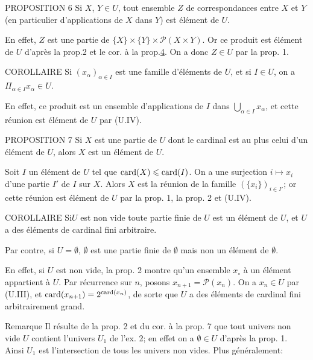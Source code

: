 \documentclass[10pt]{../fichiers-configuration-latex/smfart}
\begin{document}
\begin{enonce*}{PROPOSITION 6}
Si $X$, $Y\in U$, tout ensemble $Z$ de correspondances entre $X$ et
$Y$ (en particulier d'applications de $X$ dans $Y$) est élément de
$U$.
\end{enonce*}
En effet, $Z$ est une partie de $\{X\}\times \{Y\}\times
\mathcal{P}(X\times Y)$. Or ce produit est élément de $U$
d'après la
prop.2 et le cor. à la prop.\hyperref[I.sec4]{4}. On a donc $Z\in
U$ par la prop. 1.

\begin{enonce*}{COROLLAIRE}
Si $(x_{\alpha})_{\alpha \in I}$ est une famille d'éléments de $U$,
et si $I\in U$, on a $\Pi_{\alpha\in I}x_{\alpha} \in U$.
\end{enonce*}
En effet, ce produit est un ensemble d'applications de $I$ dans
$\bigcup_{\alpha\in I}x_{\alpha}$, et cette réunion est élément de
$U$ par (U.IV).

\begin{enonce*}{PROPOSITION 7}
Si $X$ est une partie de $U$ dont le cardinal est au plus celui d'un
élément de $U$, alors $X$ est un élément de $U$.
\end{enonce*}
Soit $I$ un élément de $U$ tel que $\operatorname{card}(X)\leqslant \operatorname{card}(I)$. On a une
surjection $i\mapsto x_i$ d'une partie $I'$ de $I$ sur $X$. Alors
$X$ est la réunion de la famille $(\{x_i\})_{i\in I'}$; or cette
réunion est élément de $U$ par la prop. 1, la prop. 2 et (U.IV).

\begin{enonce*}{COROLLAIRE}
Si\pageoriginale $U$ est non vide toute partie finie de $U$ est un
élément de $U$, et $U$ a des éléments de cardinal fini arbitraire.
\end{enonce*}
Par contre, si $U=∅$, $∅$ est une partie finie
de $∅$ mais non un élément de $∅$.

En effet, si $U$ est non vide, la prop. 2 montre qu'un ensemble
$x_{\circ}$ à un élément appartient à $U$. Par récurrence sur $n$,
posons $x_{n+1}=\mathcal{P}(x_n)$. On %
a $x_n\in U$ par (U.III), et $\operatorname{card}(x_{n+1})=2^{\operatorname{card}(x_n)}$, de
sorte que $U$ a des éléments de cardinal fini arbitrairement grand.

\begin{enonce*}[remark]{Remarque}
Il résulte de la prop. 2 et du cor. à la prop. 7 que tout univers
non vide $U$ contient l'univers $U_1$ de l'ex. 2; en effet on a
$∅\in U$ d'après la prop. 1. Ainsi $U_1$ est
l'intersection de tous les univers non vides. Plus généralement:
\end{enonce*}
\end{document}
